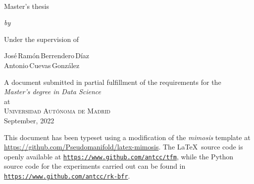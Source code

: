 

\newpage

\begin{titlepage}
  \vspace*{5cm}
  \makeatletter
  \begin{center}
    \begin{singlespace*}
    \begin{Huge}
      \@title
    \end{Huge}\\[1cm]
    \begin{large}
      Master's thesis
    \end{large}
    \vskip 0.1cm
    \emph{by}
    \vskip 0.18cm
    \begin{Large}
    \textsc{\@author}
  \end{Large}
  \end{singlespace*}
    \vfill

    Under the supervision of
    \begin{large}
    \vskip 0.1cm
    José\,Ramón\,Berrendero\,Díaz\\
    Antonio\,Cuevas\,González\\[1cm]
  \end{large}

    A document submitted in partial fulfillment
    of the requirements for the\\
    \emph{Master's degree in Data Science}\\
    at\\
    \textsc{Universidad Autónoma de Madrid}\\[1cm]

    September, 2022
  \end{center}
  \makeatother
\end{titlepage}
\newpage





\thispagestyle{empty}
\pagebreak
\hspace{0pt}
\vfill
\begin{center}
    \begin{minipage}[t]{12.5cm}
        \doclicenseThis
        This document has been typeset using a modification of the \textit{mimosis} template at \url{https://github.com/Pseudomanifold/latex-mimosis}. The \LaTeX\ source code is openly available at \texttt{\url{https://www.github.com/antcc/tfm}}, while the Python source code for the experiments carried out can be found in \texttt{\url{https://www.github.com/antcc/rk-bfr}}.
    \end{minipage}
\end{center}
\vfill
\hspace{0pt}
\pagebreak
\newpage

